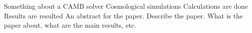  
  \abstract
   {Something about a CAMB solver}
   {Cosmological simulations}
   {Calculations are done}
   {Results are resulted}
   {An abstract for the paper. Describe the paper. What is the paper about, what are the main results, etc.}


   \maketitle
%
